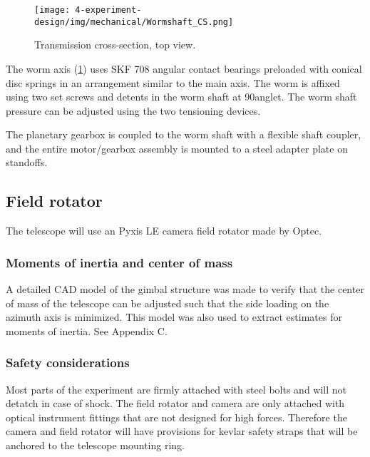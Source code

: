 \begin{figure}[H]
	\centering 
	\texttt{[image: 4-experiment-design/img/mechanical/Wormshaft\_CS.png]}
	\caption{Transmission cross-section, top view.}
	\label{fig::mechanical::worm_cs}
\end{figure}

The worm axis (\ref{fig::mechanical::worm_cs}) uses SKF 708 angular contact bearings preloaded with conical disc springs in an arrangement similar to the main axis. The worm is affixed using two set screws and detents in the worm shaft at 90\degree anglet. The worm shaft pressure can be adjusted using the two tensioning devices. 

The planetary gearbox is coupled to the worm shaft with a flexible shaft coupler, and the entire motor/gearbox assembly is mounted to a steel adapter plate on standoffs. 

\subsection{Field rotator}

The telescope will use an Pyxis LE camera field rotator made by Optec. 

\subsubsection{Moments of inertia and center of mass}

A detailed CAD model of the gimbal structure was made to verify that the center of mass of the telescope can be adjusted such that the side loading on the azimuth axis is minimized. This model was also used to extract estimates for moments of inertia. See Appendix C.

\subsubsection{Safety considerations}

Most parts of the experiment are firmly attached with steel bolts and will not detatch in case of shock. The field rotator and camera are only attached with optical instrument fittings that are not designed for high forces. Therefore the camera and field rotator will have provisions for kevlar safety straps that will be anchored to the telescope mounting ring. 
